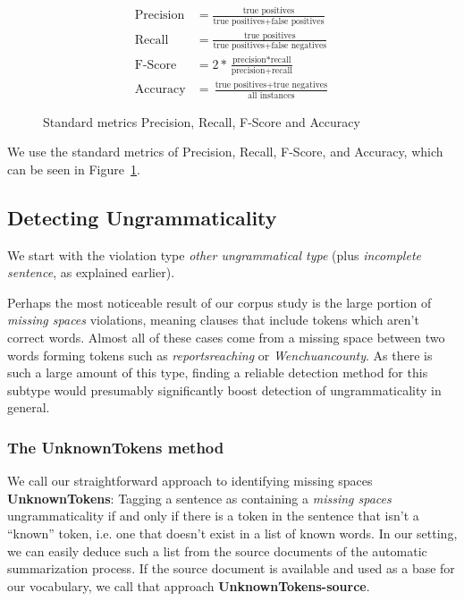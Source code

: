 \documentclass[a4paper,10pt]{scrartcl}
\theoremstyle{style}
\begin{document}
\begin{figure}
	\begin{subequations*}
	\begin{align*}
		\text{Precision} &= \frac{\text{true positives}}{\text{true positives} + \text{false positives}}\\
		\text{Recall} &= \frac{\text{true positives}}{\text{true positives} + \text{false negatives}}\\
		\text{F-Score} &= 2*\frac{\text{precision}*\text{recall}}{\text{precision}+\text{recall}}\\
		\text{Accuracy} &= \frac{\text{true positives}+\text{true negatives}}{\text{all instances}}
	\end{align*}
	\end{subequations*}
	\label{metrics}
	\caption{Standard metrics Precision, Recall, F-Score and Accuracy}
\end{figure}

We use the standard metrics of Precision, Recall, F-Score, and Accuracy, which can be seen in Figure~\ref{metrics}.

\subsection{Detecting Ungrammaticality}
\label{sec_unknowntokens}
We start with the violation type \textit{other ungrammatical type} (plus \textit{incomplete sentence}, as explained earlier).

Perhaps the most noticeable result of our corpus study is the large portion of \textit{missing spaces} violations, meaning clauses that include tokens which aren't correct words. Almost all of these cases come from a missing space between two words forming tokens such as \textit{reportsreaching} or \textit{Wenchuancounty}. As there is such a large amount of this type, finding a reliable detection method for this subtype would presumably significantly boost detection of ungrammaticality in general.

\subsubsection{The UnknownTokens method}
We call our straightforward approach to identifying missing spaces \textbf{UnknownTokens}: Tagging a sentence as containing a \textit{missing spaces} ungrammaticality if and only if there is a token in the sentence that isn't a ``known'' token, i.e. one that doesn't exist in a list of known words. In our setting, we can easily deduce such a list from the source documents of the automatic summarization process. If the source document is available and used as a base for our vocabulary, we call that approach \textbf{UnknownTokens-source}.
\end{document}
